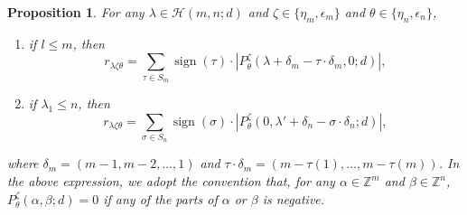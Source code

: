 \documentclass[12pt,reqno]{amsart}
\newtheorem{proposition}[theorem]{Proposition}
\theoremstyle{definition}
\theoremstyle{remark}
\newcommand{\Hi}{\mathcal{H}(m,n;d)}
\DeclareMathOperator{\sign}{sign}
\begin{document}
\begin{proposition}\label{trivialRestriction}
    For any $\lambda\in\Hi$ and $\zeta\in\{\eta_{m},\epsilon_{m}\}$ and $\theta\in\{\eta_{n},\epsilon_{n}\}$,  

    \begin{enumerate}
        \item if $l\leq m$, then 
        $$r_{\lambda\zeta\theta}=\sum_{\tau\in S_{m}}\sign(\tau)\cdot |P^{\zeta}_{\theta}(\lambda+\delta_{m}-\tau\cdot\delta_{m},0;d)|,$$
        \item if $\lambda_{1}\leq n$, then 
        $$r_{\lambda\zeta\theta}=\sum_{\sigma\in S_{n}}\sign(\sigma)\cdot |P^{\zeta}_{\theta}(0,\lambda'+\delta_{n}-\sigma\cdot\delta_{n};d)|,$$
    \end{enumerate}

    where $\delta_{m}=(m-1,m-2,\dotsc,1)$ and $\tau\cdot\delta_{m}=(m-\tau(1),\dotsc,m-\tau(m))$. In the above expression, we adopt the convention that, for any $\alpha\in\mathbb{Z}^{m}$ and $\beta\in\mathbb{Z}^{n}$, $P^{\zeta}_{\theta}(\alpha,\beta;d)=0$ if any of the parts of $\alpha$ or $\beta$ is negative.
\end{proposition}
\end{document}
